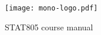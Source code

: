 
\texttt{[image: mono-logo.pdf]}

\begin{centering}
{\Huge STAT805 course manual}
\end{centering}


